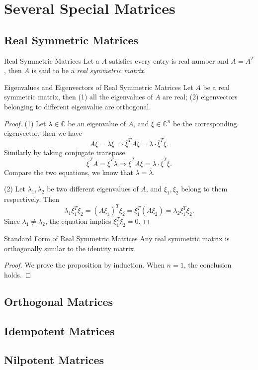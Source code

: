 \section{Several Special Matrices}

\subsection{Real Symmetric Matrices}

\begin{definition}{Real Symmetric Matrices}{}
  Let a $A$ satisfies every entry is real number and $A = A^T$,
  then $A$ is said to be a \emph{real symmetric matrix}.
\end{definition}

\begin{proposition}{Eigenvalues and Eigenvectors of Real Symmetric Matrices}{}
  Let $A$ be a real symmetric matrix, then
  (1) all the eigenvalues of $A$ are real;
  (2) eigenvectors belonging to different eigenvalue are orthogonal.
\end{proposition}

\begin{proof}
  (1) Let $\lambda \in \mathbb{C}$ be an eigenvalue of $A$,
  and $\xi \in \mathbb{C}^n$ be the corresponding eigenvector,
  then we have
  \begin{equation}
    A\xi = \lambda \xi \Rightarrow \overline{\xi}^T A\xi = \lambda \cdot \overline{\xi}^T\xi.
  \end{equation}
  Similarly by taking conjugate transpose
  \begin{equation}
    \overline{\xi}^T A = \overline{\xi}^T \overline{\lambda} \Rightarrow
    \overline{\xi}^T A \xi = \overline{\lambda}  \cdot \overline{\xi}^T \xi.
  \end{equation}
  Compare the two equations, we know that $\lambda = \overline{\lambda}$.

  (2) Let $\lambda_1, \lambda_2$ be two different eigenvalues of $A$,
  and $\xi_1, \xi_2$ belong to them respectively.
  Then
  \begin{equation}
    \lambda_1 \xi_1^T \xi_2 = (A\xi_1)^T\xi_2 = \xi_1^T (A\xi_2) = \lambda_2 \xi_1^T\xi_2.
  \end{equation}
  Since $\lambda_1 \neq \lambda_2$, the equation implies $\xi_1^T\xi_2 = 0$.
\end{proof}

\begin{proposition}{Standard Form of Real Symmetric Matrices}{}
  Any real symmetric matrix is orthogonally similar to the identity matrix.
\end{proposition}

\begin{proof}
  We prove the proposition by induction.
  When $n = 1$, the conclusion holds.
\end{proof}

\subsection{Orthogonal Matrices}

\subsection{Idempotent Matrices}

\subsection{Nilpotent Matrices}

